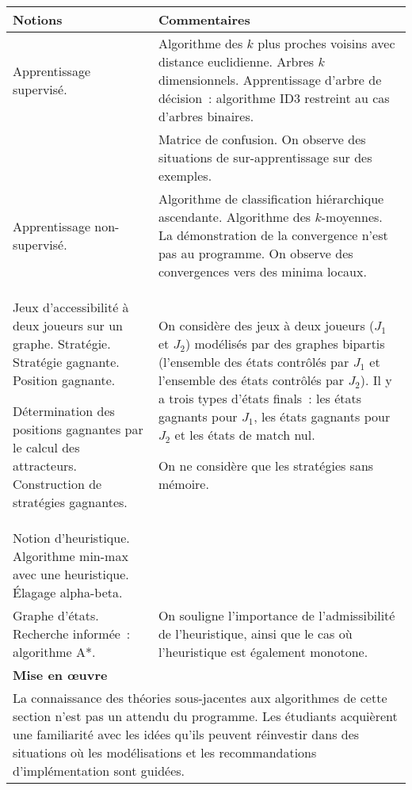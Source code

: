 \noindent
\begin{longtable}{|p{\lnotion}|p{\comment}|}
    \hline
    \textbf{Notions} & \textbf{Commentaires} \\
    \hline \hline
    Apprentissage supervisé.&
    Algorithme des $k$ plus proches voisins avec distance euclidienne. Arbres $k$ dimensionnels. Apprentissage d’arbre de décision~: algorithme ID3 restreint au cas d’arbres binaires.
     \\
    & Matrice de confusion. On observe des situations de sur-apprentissage sur des exemples.
    \\
    \hline
    Apprentissage non-supervisé.
    & Algorithme de classification hiérarchique ascendante. Algorithme des $k$-moyennes. La démonstration de la convergence n'est pas au programme. On observe des convergences vers des minima locaux.
    \\
    \hline
    Jeux d’accessibilité à deux joueurs sur un graphe. Stratégie. Stratégie gagnante. Position gagnante.
    
      Détermination des positions gagnantes par le calcul des attracteurs. Construction de stratégies gagnantes.&
    	
    
    On considère des jeux à deux joueurs ($J_1$ et $J_2$) modélisés par des graphes bipartis (l’ensemble des états contrôlés par $J_1$ et l’ensemble des états contrôlés par $J_2$). Il y a trois types d’états finals~: les états gagnants pour $J_1$, les états gagnants pour $J_2$ et les états de match nul.
    
    On ne considère que les stratégies sans mémoire.
      \\
    
    \hline
    
    Notion d'heuristique. Algorithme min-max avec une heuristique. Élagage alpha-beta. &
    	
    \\ 
    \hline 
        Graphe d'états. Recherche informée~: algorithme A*.
        & On souligne l'importance de l'admissibilité de l'heuristique, ainsi que le cas où l'heuristique est également monotone.
     \\
    \hline \hline
        \multicolumn{2}{|p{\lmoe}|}{\textbf{Mise en \oe uvre}} \\
        \hline 
        \multicolumn{2}{|p{\lmoe}|}{
    La connaissance des théories sous-jacentes aux algorithmes de cette section n'est pas un attendu du programme. Les étudiants acquièrent une familiarité avec les idées qu'ils peuvent réinvestir dans des situations où les modélisations et les recommandations d'implémentation sont guidées. %
            } \\
            \hline
    
\end{longtable}



